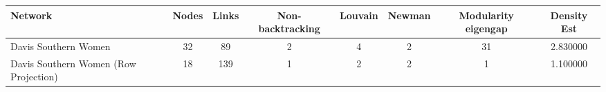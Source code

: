 \begin{tabular}{l|c|c|c|c|c|c|c}
\toprule
Network & Nodes & Links & Non-backtracking & Louvain & Newman & Modularity eigengap & Density Est \\
\midrule
Davis Southern Women & 32 & 89 & 2 & 4 & 2 & 31 & 2.830000 \\
Davis Southern Women (Row Projection) & 18 & 139 & 1 & 2 & 2 & 1 & 1.100000 \\
\bottomrule
\end{tabular}
